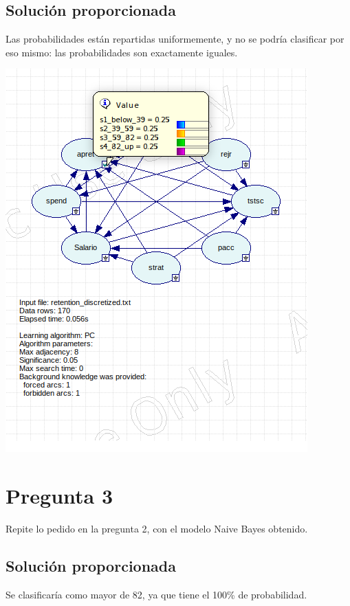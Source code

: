 \documentclass{article}
\begin{document}
\subsection{Solución proporcionada}

Las probabilidades están repartidas uniformemente, y no se podría clasificar por eso mismo: las probabilidades son exactamente iguales.

\begin{center}
\includegraphics[scale=0.4]{images/learning.png}
\end{center}

\section{Pregunta 3}

Repite lo pedido en la pregunta 2, con el modelo Naive Bayes obtenido.

\subsection{Solución proporcionada}

Se clasificaría como mayor de 82, ya que tiene el 100\% de probabilidad.
\end{document}
